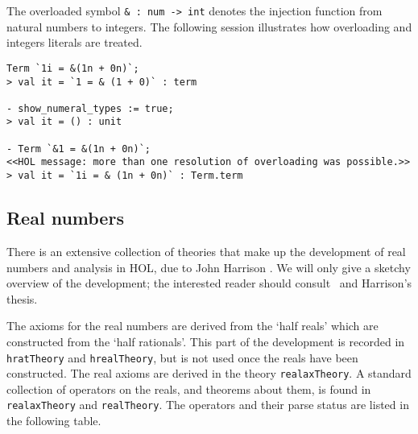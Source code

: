 The overloaded symbol {\small\verb+& : num -> int+} denotes the
injection function from natural numbers to integers. The following
session illustrates how overloading and integers literals are treated.

\begin{session}
\begin{verbatim}
Term `1i = &(1n + 0n)`;
> val it = `1 = & (1 + 0)` : term

- show_numeral_types := true;
> val it = () : unit

- Term `&1 = &(1n + 0n)`;
<<HOL message: more than one resolution of overloading was possible.>>
> val it = `1i = & (1n + 0n)` : Term.term
\end{verbatim}
\end{session}


\subsection{Real numbers}

There is an extensive collection of theories that make up the
development of real numbers and analysis in HOL, due to John Harrison
\cite{jrh:thesis}. We will only give a sketchy overview of the
development; the interested reader should consult \REFERENCE\ and
Harrison's thesis.

The axioms for the real numbers are derived from the `half reals' which
are constructed from the `half rationals'. This part of the development
is recorded in {\small\verb+hratTheory+} and
{\small\verb+hrealTheory+}, but is not used once the reals have been
constructed. The real axioms are derived in the theory
{\small\verb+realaxTheory+}. A standard collection of operators on the
reals, and theorems about them, is found in {\small\verb+realaxTheory+}
and {\small\verb+realTheory+}. The operators and their parse status are
listed in the following table.

